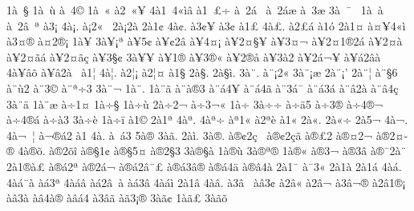 {1^^e0^^a0^^a7
1^^e0^^a0^^f9
^^e0^^a04^^a9^^ad
1^^e0^^a0^^ab
^^e02^^a0^^ab^^a5
4^^e01^^a04^^ab^^ec^^e2
^^e01^^a0^^ad^^a3^^f7
^^e0^^a0^^ad2^^e1^^a0
^^e0^^a0^^ad2^^e1^^e6
^^e0^^a03^^ad^^e6
3^^e0^^a0^^af^^a0
1^^e0^^a0^^e0
^^e0^^a02^^e2^^a0^^aa
^^e03^^a1
4^^e0^^a1.
^^e0^^a12^^ab^^a0
2^^e0^^a12^^e0
2^^e01^^a2
4^^e0^^a2.
^^e03^^a2^^a5^^ad
^^e03^^a2^^ad
^^e01^^a3
4^^e0^^a3.
^^e02^^a3^^e1
^^e01^^f3
2^^e01^^a4
^^e0^^a4^^a54^^ab^^ec
^^e03^^a4^^ae
^^e0^^a42^^ae^^a1
1^^e0^^a5
3^^e0^^a5^^a1^^aa
^^e0^^a55^^a2
^^e0^^a5^^a22^^e2
^^e0^^a54^^a4^^a1
^^e0^^a52^^a4^^a7^^a5
^^e0^^a53^^a4^^ac
^^e0^^a52^^a41^^ae2^^e1
^^e0^^a52^^a4^^e0
^^e0^^a52^^a4^^e3^^e1
^^e0^^a52^^a4^^e3^^e7
^^e0^^a53^^a7^^a2
3^^e0^^a5^^ad^^a5
^^e0^^a51^^ae
^^e0^^a53^^ae^^ab
^^e0^^a52^^ae^^e5
^^e0^^a53^^e02
^^e0^^a52^^e1^^ac^^a5
^^e0^^a5^^e12^^e2^^e0
4^^e0^^a5^^e2^^f5
^^e0^^a5^^e22^^e0^^a0
^^e01^^a6
4^^e0^^a6.
^^e02^^a6^^a1
^^e02^^a6^^a4
^^e01^^a7
2^^e0^^a7.
2^^e0^^a7^^ec.
3^^e0^^a8.
^^e0^^a8^^a12^^ab
3^^e0^^a8^^a1^^e6
2^^e0^^a8^^a1'
2^^e0^^a8^^a6
^^e0^^a8^^a76^^ad^^a0
^^e0^^a8^^f92
^^e0^^a83^^a9
^^e0^^a8^^aa^^f73
3^^e0^^a8^^ac^^ad
1^^e0^^a8^^ad.
1^^e0^^a8^^ad^^e3
^^e0^^a8^^e0^^ae3
^^e0^^a8^^e14^^ad^^a5
^^e0^^a8^^e14^^ad^^e3
^^e0^^a83^^e1^^af
^^e0^^a8^^e13^^e1
^^e0^^a8^^e22^^e0
^^e0^^a8^^e24^^e7
3^^e0^^a8^^e4
1^^e0^^a8^^e6
^^e0^^f71^^a4
1^^e0^^f7^^a7
1^^e0^^f7^^f9
2^^e0^^f72^^ac
^^e0^^f73^^ac^^ab
1^^e0^^f7^^ad
3^^e0^^f7^^ad^^f7
^^e0^^f7^^ad^^e45
^^e0^^f73^^ae
^^e0^^f74^^ae^^ac
^^e0^^f74^^ae^^e1
^^e0^^f7^^e03
3^^e0^^f7^^e8
1^^e0^^f7^^ef
^^e01^^a9
2^^e01^^aa
4^^e0^^aa.
4^^e0^^aa^^f7^^ad
^^e0^^aa1^^ab
^^e02^^aa^^e8
^^e01^^ab
2^^e0^^ab.
2^^e0^^ab^^f7^^ad
2^^e05^^ac
4^^e0^^ac.
4^^e0^^ac^^a0^^a6
^^e0^^ac^^ae^^e12
^^e01^^ad
4^^e0^^ad.
^^e0^^ad^^a0^^e13
5^^e0^^ad^^ae
3^^e0^^ad^^e3.
2^^e0^^ad^^ec.
3^^e0^^ae.
^^e0^^ae^^a22^^e7^^a0
^^e0^^ae^^a22^^e7^^e3
^^e0^^ae^^a32
^^e0^^ae^^a42^^ac
^^e0^^ae2^^a4^^ad^^ae
4^^e0^^ae^^f5.
^^e0^^ae2^^f5^^ee
^^e0^^ae^^a71^^a2
^^e0^^ae^^a75^^a4
^^e0^^ae2^^a73^^ad
3^^e0^^ae^^a7^^e0
1^^e0^^ae^^f9
3^^e0^^ae^^aa^^ae
1^^e0^^ae^^ab
^^e0^^ae3^^ac
^^e0^^ae3^^ad^^e2
^^e0^^ae^^af2^^e0^^a8
2^^e01^^ae^^e0^^a3
^^e0^^ae^^e12^^aa
^^e0^^ae2^^e1^^ac
^^e0^^ae^^e12^^e2^^a8^^a3
^^e0^^ae^^e13^^e2^^ae
^^e0^^ae^^e14^^e4
^^e0^^ae^^e24^^e0
2^^e01^^af
^^e0^^af3^^ab
2^^e01^^e0
2^^e01^^e1
4^^e0^^e1.
4^^e0^^e1^^a8^^e0
^^e0^^e13^^aa
4^^e0^^e1^^e2
^^e0^^e12^^e2^^a0^^e0
^^e0^^e13^^e2^^ad
4^^e0^^e1^^ec
2^^e01^^e2
4^^e0^^e2.
^^e03^^e2^^a0
^^e0^^e23^^a2
^^e02^^e2^^ab
^^e02^^e2^^ac
^^e03^^e2^^ac^^ae
^^e02^^e21^^ae^^a1
^^e0^^e23^^e0
^^e0^^e24^^e0^^ae
^^e0^^e2^^e14
^^e03^^e2^^e3
^^e0^^e33^^a1^^ae
3^^e0^^e3^^a2
1^^e0^^e3^^a3
3^^e0^^e3^^f5
}
